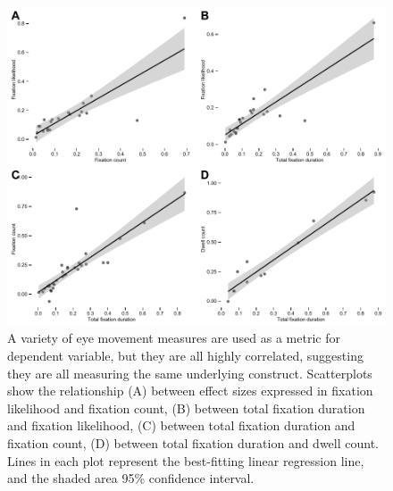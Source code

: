 \documentclass[english,natbib,man,floatsintext]{apa6}
\begin{document}

\clearpage


\begin{figure}%
\includegraphics{metric_correction}
\centering
\caption{A variety of eye movement measures are used as a metric for dependent variable, but they are all highly correlated, suggesting they are all measuring the same underlying construct. Scatterplots show the relationship (A) between effect sizes expressed in fixation likelihood and fixation count, (B) between total fixation duration and fixation likelihood, (C) between total fixation duration and fixation count, (D) between total fixation duration and dwell count. Lines in each plot represent the best-fitting linear regression line, and the shaded area 95\% confidence interval.}
\label{fig:metric_correction}
\end{figure}
\clearpage



\clearpage



\clearpage


\clearpage
\end{document}
